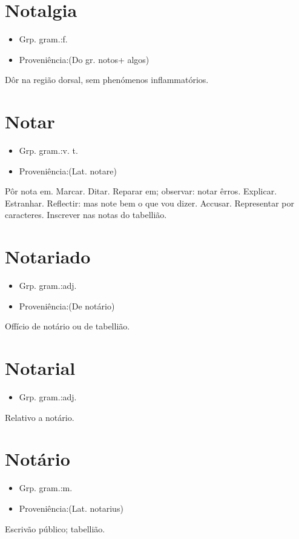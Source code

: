 \section{Notalgia}
\begin{itemize}
\item {Grp. gram.:f.}
\end{itemize}
\begin{itemize}
\item {Proveniência:(Do gr. \textunderscore notos\textunderscore  + \textunderscore algos\textunderscore )}
\end{itemize}
Dôr na região dorsal, sem phenómenos inflammatórios.
\section{Notar}
\begin{itemize}
\item {Grp. gram.:v. t.}
\end{itemize}
\begin{itemize}
\item {Proveniência:(Lat. \textunderscore notare\textunderscore )}
\end{itemize}
Pôr nota em.
Marcar.
Ditar.
Reparar em; observar: \textunderscore notar êrros\textunderscore .
Explicar.
Estranhar.
Reflectir: \textunderscore mas note bem o que vou dizer\textunderscore .
Accusar.
Representar por caracteres.
Inscrever nas notas do tabellião.
\section{Notariado}
\begin{itemize}
\item {Grp. gram.:adj.}
\end{itemize}
\begin{itemize}
\item {Proveniência:(De \textunderscore notário\textunderscore )}
\end{itemize}
Offício de notário ou de tabellião.
\section{Notarial}
\begin{itemize}
\item {Grp. gram.:adj.}
\end{itemize}
Relativo a notário.
\section{Notário}
\begin{itemize}
\item {Grp. gram.:m.}
\end{itemize}
\begin{itemize}
\item {Proveniência:(Lat. \textunderscore notarius\textunderscore )}
\end{itemize}
Escrivão público; tabellião.
